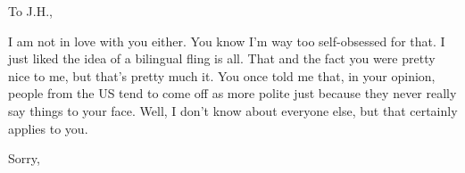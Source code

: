 \documentclass{letter}
\begin{document}
\begin{letter}{}
\opening{To J.H.,}
I am not in love with you either. You know I’m way too self-obsessed for that. I
just liked the idea of a bilingual fling is all. That and the fact you were
pretty nice to me, but that's pretty much it. You once told me that, in your
opinion, people from the US tend to come off as more polite just because they
never really say things to your face. Well, I don't know about everyone else,
but that certainly applies to you.
\closing{Sorry,}
\end{letter}
\end{document}
